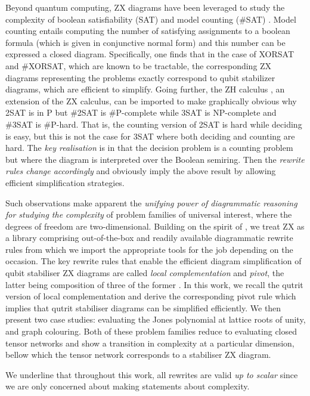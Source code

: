 Beyond quantum computing, ZX diagrams have been leveraged to study the complexity of boolean satisfiability (SAT) and model counting (\#SAT) \cite{debeaudrap2020tensor}.
Model counting entails computing the number of satisfying assignments to a boolean formula (which is given in conjunctive normal form)
and this number can be expressed a closed diagram.
Specifically, one finds that in the case of XORSAT and \#XORSAT,
which are known to be tractable,
the corresponding ZX diagrams representing the problems exactly correspond to qubit stabilizer diagrams, which are efficient to simplify.
Going further, the ZH calculus \cite{backens2018zh}, an extension of the ZX calculus, can be imported to make graphically obvious
why 2SAT is in P but \#2SAT is \#P-complete while 3SAT is NP-complete and \#3SAT is \#P-hard.
That is, the counting version of 2SAT is hard while deciding is easy, but this is not the case for 3SAT where both deciding and counting are hard.
The \emph{key realisation} is in that the decision problem is a counting problem
but where the diagram is interpreted over the Boolean semiring.
Then the \emph{rewrite rules change accordingly} and obviously imply the above result by allowing efficient simplification strategies.

Such observations make apparent the \emph{unifying power of diagrammatic reasoning
for studying the complexity} of problem families of universal interest,
where the degrees of freedom are two-dimensional.
Building on the spirit of \cite{debeaudrap2020tensor}, we treat ZX as a library comprising out-of-the-box and readily available diagrammatic rewrite rules from which we import the appropriate tools for the job depending on the occasion.
The key rewrite rules that enable the efficient diagram simplification
of qubit stabiliser ZX diagrams
are called \emph{local complementation} and \emph{pivot},
the latter being composition of three of the former \cite{graph_theoretic_simplification}.
In this work, we recall the qutrit version of local complementation and derive the corresponding pivot rule
which implies that qutrit stabiliser diagrams can be simplified efficiently.
We then present two case studies: evaluating the Jones polynomial at lattice roots of unity, and graph colouring.
Both of these problem families reduce to evaluating
closed tensor networks and show a transition in complexity
at a particular dimension, bellow which the tensor network corresponds to a stabiliser ZX diagram.

We underline that throughout this work, all rewrites are valid
\emph{up to scalar}
since we are only concerned about making statements about complexity.